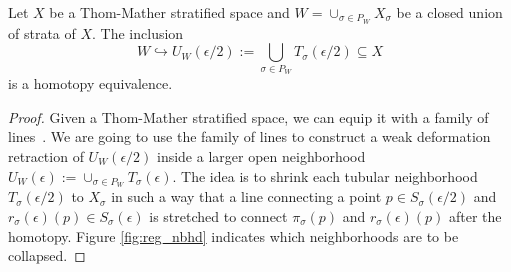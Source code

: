 \begin{prop}\label{prop:reg_nbhd}
	Let $X$ be a Thom-Mather stratified space and $W=\cup_{\sigma\in P_W} X_{\sigma}$ be a closed union of strata of $X$. The inclusion
	\[
		W\hookrightarrow U_W(\epsilon/2):=\bigcup_{\sigma\in P_W} T_{\sigma}(\epsilon/2)\subseteq X
	\]
	is a homotopy equivalence.
\end{prop}
\begin{proof}
	Given a Thom-Mather stratified space, we can equip it with a family of lines~\cite{goresky-fol}. We are going to use the family of lines to construct a weak deformation retraction of $U_W(\epsilon/2)$ inside a larger open neighborhood $U_W(\epsilon):=\cup_{\sigma\in P_W} T_{\sigma}(\epsilon)$. The idea is to shrink each tubular neighborhood $T_{\sigma}(\epsilon/2)$ to $X_{\sigma}$ in such a way that a line connecting a point $p\in S_{\sigma}(\epsilon/2)$ and $r_{\sigma}(\epsilon)(p)\in S_{\sigma}(\epsilon)$ is stretched to connect $\pi_{\sigma}(p)$ and $r_{\sigma}(\epsilon)(p)$ after the homotopy. Figure \ref{fig:reg_nbhd} indicates which neighborhoods are to be collapsed.
	

\end{proof}
